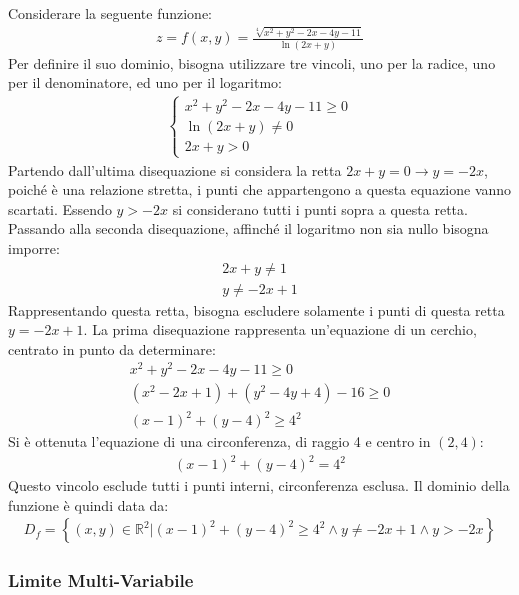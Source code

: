 \documentclass{article}
\numberwithin{equation}{subsection}
\begin{document}
Considerare la seguente funzione:
\begin{gather*}
    z=f(x,y)=\displaystyle\frac{\sqrt[4]{x^2+y^2-2x-4y-11}}{\ln(2x+y)}
\end{gather*}
Per definire il suo dominio, bisogna utilizzare tre vincoli, uno per la radice, uno per il denominatore, ed uno per il logaritmo:
\begin{gather*}
    \begin{cases}
        x^2+y^2-2x-4y-11\geq0\\
        \ln(2x+y)\neq0\\
        2x+y>0
    \end{cases}
\end{gather*}
Partendo dall'ultima disequazione si considera la retta $2x+y=0\to y=-2x$, poiché è una relazione stretta, i punti che appartengono a questa equazione vanno scartati. 
Essendo $y>-2x$ si considerano tutti i punti sopra a questa retta. Passando alla seconda disequazione, affinché il logaritmo non sia nullo bisogna imporre:
\begin{gather*}
    2x+y\neq1\\
    y\neq-2x+1
\end{gather*}
Rappresentando questa retta, bisogna escludere solamente i punti di questa retta $y=-2x+1$. 
La prima disequazione rappresenta un'equazione di un cerchio, centrato in punto da determinare:
\begin{gather*}
    x^2+y^2-2x-4y-11\geq0\\
    (x^2-2x+1)+(y^2-4y+4)-16\geq0\\
    (x-1)^2+(y-4)^2\geq4^2
\end{gather*}
Si è ottenuta l'equazione di una circonferenza, di raggio 4 e centro in $(2,4)$:
\begin{gather*}
    (x-1)^2+(y-4)^2=4^2
\end{gather*}
Questo vincolo esclude tutti i punti interni, circonferenza esclusa. Il dominio della funzione è quindi data da:
\begin{gather*}
    D_f=\left\{(x,y)\in\mathbb{R}^2\big|(x-1)^2+(y-4)^2\geq4^2\land y\neq-2x+1\land y>-2x\right\}
\end{gather*}

\subsubsection{Limite Multi-Variabile}
\end{document}

